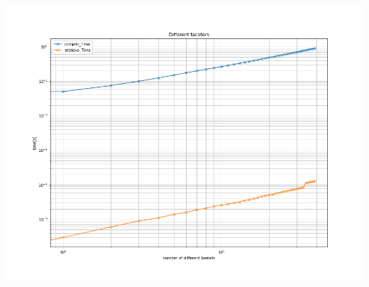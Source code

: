 \documentclass[11pt,a4paper]{article}
\begin{document}
\begin{center}
	\begin{minipage}[t]{0.49\textwidth}
		\includegraphics[width=\textwidth]{Bilder/Time_to_compile_and_clean}
	\end{minipage}
\end{center}

	
\end{document}
